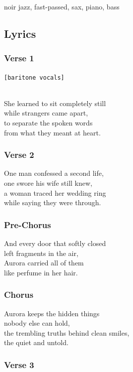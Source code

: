 noir jazz, fast-passed, sax, piano, bass

\subsection{Lyrics}\label{lyrics-11}

\subsubsection{Verse 1}\label{verse-1-7}

\texttt{{[}baritone\ vocals{]}}\strut \\
She learned to sit completely still\\
while strangers came apart,\\
to separate the spoken words\\
from what they meant at heart.

\subsubsection{Verse 2}\label{verse-2-7}

One man confessed a second life,\\
one swore his wife still knew,\\
a woman traced her wedding ring\\
while saying they were through.

\subsubsection{Pre-Chorus}\label{pre-chorus-14}

And every door that softly closed\\
left fragments in the air,\\
Aurora carried all of them\\
like perfume in her hair.

\subsubsection{Chorus}\label{chorus-24}

Aurora keeps the hidden things\\
nobody else can hold,\\
the trembling truths behind clean smiles,\\
the quiet and untold.

\subsubsection{Verse 3}\label{verse-3-4}

